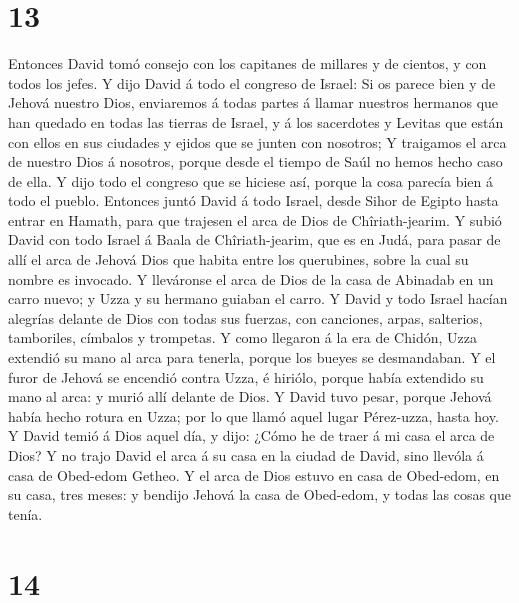 \hypertarget{section-12}{%
\section{13}\label{section-12}}

 Entonces David tomó consejo con los capitanes de millares y
de cientos, y con todos los jefes.  Y dijo David á todo el
congreso de Israel: Si os parece bien y de Jehová nuestro Dios,
enviaremos á todas partes á llamar nuestros hermanos que han quedado en
todas las tierras de Israel, y á los sacerdotes y Levitas que están con
ellos en sus ciudades y ejidos que se junten con nosotros; 
Y traigamos el arca de nuestro Dios á nosotros, porque desde el tiempo
de Saúl no hemos hecho caso de ella.  Y dijo todo el
congreso que se hiciese así, porque la cosa parecía bien á todo el
pueblo.  Entonces juntó David á todo Israel, desde Sihor de
Egipto hasta entrar en Hamath, para que trajesen el arca de Dios de
Chîriath-jearim.  Y subió David con todo Israel á Baala de
Chîriath-jearim, que es en Judá, para pasar de allí el arca de Jehová
Dios que habita entre los querubines, sobre la cual su nombre es
invocado.  Y lleváronse el arca de Dios de la casa de
Abinadab en un carro nuevo; y Uzza y su hermano guiaban el carro.
 Y David y todo Israel hacían alegrías delante de Dios con
todas sus fuerzas, con canciones, arpas, salterios, tamboriles, címbalos
y trompetas.  Y como llegaron á la era de Chidón, Uzza
extendió su mano al arca para tenerla, porque los bueyes se desmandaban.
 Y el furor de Jehová se encendió contra Uzza, é hiriólo,
porque había extendido su mano al arca: y murió allí delante de Dios.
 Y David tuvo pesar, porque Jehová había hecho rotura en
Uzza; por lo que llamó aquel lugar Pérez-uzza, hasta hoy. 
Y David temió á Dios aquel día, y dijo: ¿Cómo he de traer á mi casa el
arca de Dios?  Y no trajo David el arca á su casa en la
ciudad de David, sino llevóla á casa de Obed-edom Getheo. 
Y el arca de Dios estuvo en casa de Obed-edom, en su casa, tres meses: y
bendijo Jehová la casa de Obed-edom, y todas las cosas que tenía.

\hypertarget{section-13}{%
\section{14}\label{section-13}}

